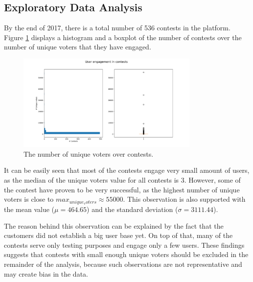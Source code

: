 \subsection{Exploratory Data Analysis}
    By the end of 2017, there is a total number of 536 contests in the platform. Figure \ref{user_engagement_in_contests} displays a histogram and a boxplot of the number of contests over the number of unique voters that they have engaged. 
    
    \begin{figure}[h] 
        \begin{center}
            \includegraphics[width=0.8\textwidth]{Images/user_engagement_in_contests.png}
            \caption{The number of unique voters over contests.}
            \label{user_engagement_in_contests}
        \end{center}
    \end{figure}

    It can be easily seen that most of the contests engage very small amount of users, as the median of the unique voters value for all contests is 3. However, some of the contest have proven to be very successful, as the highest number of unique voters is close to $max_{unique_voters} \approx 55 000$. This observation is also supported with the mean value ($\mu = 464.65$) and the standard deviation ($\sigma = 3111.44$). 
    
    The reason behind this observation can be explained by the fact that the customers did not establish a big user base yet. On top of that, many of the contests serve only testing purposes and engage only a few users. These findings suggests that contests with small enough unique voters should be excluded in the remainder of the analysis, because such observations are not representative and may create bias in the data.
    

